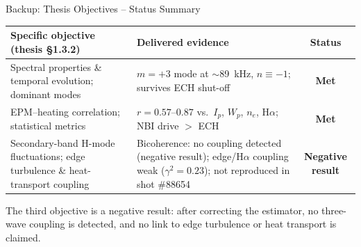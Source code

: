 \documentclass[aspectratio=169,xcolor=table]{beamer}
\begin{document}
\begin{frame}{Backup: Thesis Objectives -- Status Summary}
    \footnotesize
    \begin{center}
    \renewcommand{\arraystretch}{1.3}
    \begin{tabular}{p{6.2cm}p{5.5cm}c}
        \toprule
        Specific objective (thesis \S1.3.2) & Delivered evidence & Status \\
        \midrule
        Spectral properties \& temporal evolution; dominant modes &
        $m={+}3$ mode at $\sim$\SI{89}{kHz}, $n\equiv{-}1$; survives ECH shut-off &
        \textbf{Met} \\
        EPM--heating correlation; statistical metrics &
        $r=0.57$--$0.87$ vs.\ $I_p$, $W_p$, $n_e$, H$\alpha$; NBI drive $>$ ECH &
        \textbf{Met} \\
        Secondary-band H-mode fluctuations; edge turbulence \& heat-transport coupling &
        Bicoherence: no coupling detected (negative result); edge/H$\alpha$ coupling weak
        ($\gamma^2=0.23$); not reproduced in shot \#88654 &
        \textbf{Negative result} \\
        \bottomrule
    \end{tabular}
    \end{center}
    \vspace{0.3cm}
    \normalsize
    The third objective is a negative result: after correcting the estimator, no three-wave coupling is detected, and no link to edge turbulence or heat transport is claimed.
\end{frame}
\end{document}
